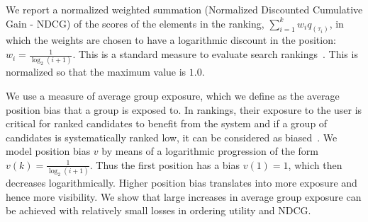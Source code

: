 %
We report a normalized weighted summation (Normalized Discounted Cumulative Gain - NDCG) of the scores of the elements in the ranking, $\sum_{i=1}^{k} w_i q_{(\tau_i)}$, in which the weights are chosen to have a logarithmic discount in the position:  $w_i = \frac{1}{\log_2 (i+1)}$. This is a standard measure to evaluate search rankings~\cite{jarvelin2002cumulated}.
This is normalized so that the maximum value is $1.0$.

\noindent{}

 We use a measure of average group exposure, which we define as the average position bias that a group is exposed to.
%
In rankings, their exposure to the user is critical for ranked candidates to benefit from the system and if a group of candidates is systematically ranked low, it can be considered as biased~\cite{friedman1996bias}.
%
We model position bias $v$ by means of a logarithmic progression of the form $v(k) = \frac{1}{\log_2(i+1)}$.
%
Thus the first position has a bias $v(1)=1$, which then decreases logarithmically.
%
Higher position bias translates into more exposure and hence more visibility.
%
We show that large increases in average group exposure can be achieved with relatively small losses in ordering utility and NDCG.


